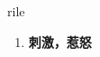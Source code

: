 
\begin{frame}
{\huge rile}
\begin{center}
\begin{enumerate}\Large
  \item \textbf{刺激，惹怒}
\end{enumerate}
\end{center}
\end{frame}
